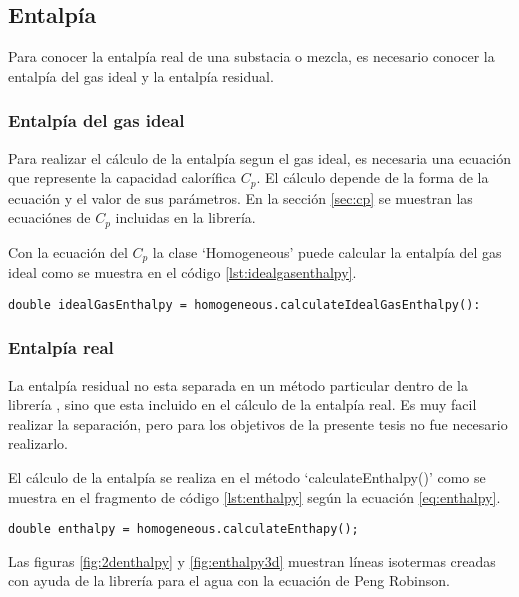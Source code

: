 \subsection{Entalpía}\label{subsec:enthalpy}

	Para conocer la entalpía real de una substacia o mezcla, es necesario conocer la entalpía del gas ideal y la entalpía residual.

\subsubsection{Entalpía del gas ideal}
	Para realizar el cálculo de la entalpía segun el gas ideal, es necesaria una ecuación que represente la capacidad calorífica $C_p$. El cálculo depende de la forma de la ecuación y el valor de sus parámetros. En la sección \ref{sec:cp} se muestran las ecuaciónes de $C_p$ incluidas en la librería.

	Con la ecuación del $C_p$ la clase `Homogeneous' puede calcular la entalpía del gas ideal como se muestra en el código \ref{lst:idealgasenthalpy}.

	\begin{lstlisting}[label={lst:idealgasenthalpy},caption={Cálculo de la entalpía del gas ideal.}]
	double idealGasEnthalpy = homogeneous.calculateIdealGasEnthalpy():
	\end{lstlisting}
	
\subsubsection{Entalpía real}

	La entalpía residual no esta separada en un método particular dentro de la librería \Materia, sino que esta incluido en el cálculo de la entalpía real. Es muy facil realizar la separación, pero para los objetivos de la presente tesis no fue necesario realizarlo.

	El cálculo de la entalpía se realiza en el método `calculateEnthalpy()' como se muestra en el fragmento de código \ref{lst:enthalpy} según la ecuación \ref{eq:enthalpy}. 

\begin{lstlisting}[caption={Cálculo de la entalpía real para una mezcla o substancia homogénea.},label={lst:enthalpy}]
	double enthalpy = homogeneous.calculateEnthapy();
\end{lstlisting}
	
	Las figuras \ref{fig:2denthalpy} y \ref{fig:enthalpy3d} muestran líneas isotermas creadas con ayuda de la librería \Materia para el agua con la ecuación de Peng Robinson.

